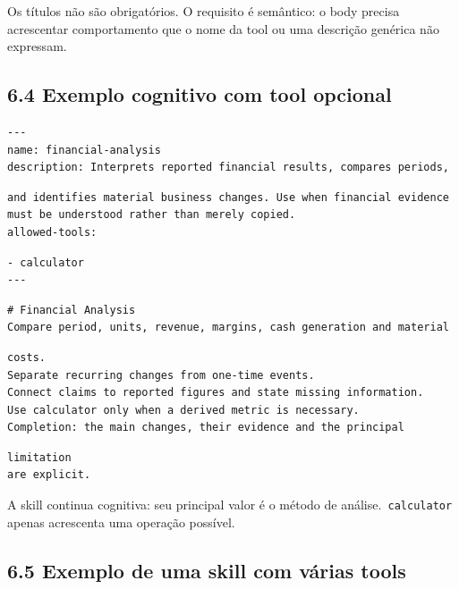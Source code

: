 \documentclass[12pt,a4paper]{article}
\begin{document}
Os títulos não são obrigatórios. O requisito é semântico: o body precisa acrescentar comportamento que o nome da tool ou uma descrição genérica não expressam.


\subsection*{6.4 Exemplo cognitivo com tool opcional}

\begin{Verbatim}[breaklines=true,breakanywhere=true,fontsize=\small]
---
name: financial-analysis
description: Interprets reported financial results, compares periods,
\end{Verbatim}

\begin{Verbatim}[breaklines=true,breakanywhere=true,fontsize=\small]
and identifies material business changes. Use when financial evidence
must be understood rather than merely copied.
allowed-tools:
\end{Verbatim}

\begin{Verbatim}[breaklines=true,breakanywhere=true,fontsize=\small]
- calculator
---
\end{Verbatim}

\begin{Verbatim}[breaklines=true,breakanywhere=true,fontsize=\small]
# Financial Analysis
Compare period, units, revenue, margins, cash generation and material
\end{Verbatim}

\begin{Verbatim}[breaklines=true,breakanywhere=true,fontsize=\small]
costs.
Separate recurring changes from one-time events.
Connect claims to reported figures and state missing information.
Use calculator only when a derived metric is necessary.
Completion: the main changes, their evidence and the principal
\end{Verbatim}

\begin{Verbatim}[breaklines=true,breakanywhere=true,fontsize=\small]
limitation
are explicit.
\end{Verbatim}

A skill continua cognitiva: seu principal valor é o método de análise.\texttt{ calculator} apenas acrescenta uma operação possível.


\subsection*{6.5 Exemplo de uma skill com várias tools}
\end{document}
